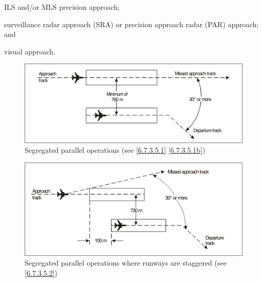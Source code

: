 \documentclass[../main.tex]{subfiles}
\begin{document}
\begin{enumeratesc}
\begin{enumerate}
            \begin{enumalph}
                \item ILS and/or MLS precision approach;
                \item surveillance radar approach (SRA) or precision approach radar (PAR) approach; and
                \item visual approach.
            \end{enumalph}

        \end{enumerate}
    \end{enumeratesc}

    \chapterend

    \begin{figure}[!ht]
        \centering
        \includegraphics[width=14cm]{Images/Fig 6-1.png}
        \caption[Segregated parallel operations]{Segregated parallel operations (see \ref{6.7.3.5.1} \ref{6.7.3.5.1b})}
        \label{fig:6-1}
    \end{figure}

    \vfill
    \begin{figure}[!ht]
        \centering
        \includegraphics[width=14cm]{Images/Fig 6-2.png}
        \caption[Segregated parallel operations where runways are staggered]{Segregated parallel operations where runways are staggered (see \ref{6.7.3.5.2})}
        \label{fig:6-2}
    \end{figure}
\end{document}

